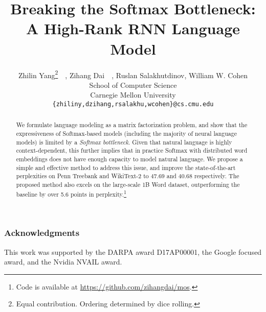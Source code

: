 \documentclass{article} %
\title{Breaking the Softmax Bottleneck: \\ A High-Rank RNN Language Model}
\author{Zhilin Yang\thanks{Equal contribution. Ordering determined by dice rolling.}~~, Zihang Dai\samethanks~~, Ruslan Salakhutdinov, William W. Cohen\\
School of Computer Science\\
Carnegie Mellon University\\
\texttt{\{zhiliny,dzihang,rsalakhu,wcohen\}@cs.cmu.edu}
}
\begin{document}
\maketitle

\begin{abstract}
We formulate language modeling as a matrix factorization problem, and show that the expressiveness of Softmax-based models (including the majority of neural language models) is limited by a {\em Softmax bottleneck}. Given that natural language is highly context-dependent, this further implies that in practice Softmax with distributed word embeddings does not have enough capacity to model natural language. We propose a simple and effective method to address this issue, and improve the state-of-the-art perplexities on Penn Treebank and WikiText-2 to 47.69 and 40.68 respectively. The proposed method also excels on the large-scale 1B Word dataset, outperforming the baseline by over 5.6 points in perplexity.\footnote{Code is available at \url{https://github.com/zihangdai/mos}.}
\end{abstract}









\subsubsection*{Acknowledgments}
This work was supported by the DARPA award D17AP00001, the Google focused award, and the Nvidia NVAIL award.

%

\clearpage




\clearpage

\end{document}
